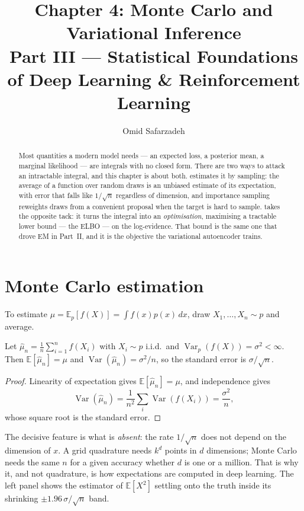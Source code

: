 \documentclass[11pt]{article}
\title{Chapter 4: Monte Carlo and Variational Inference \\ \large Part III --- Statistical Foundations of Deep Learning \& Reinforcement Learning}
\author{Omid Safarzadeh}
\date{}
\begin{document}
\maketitle

\begin{abstract}
\noindent
Most quantities a modern model needs --- an expected loss, a posterior mean, a
marginal likelihood --- are integrals with no closed form. There are two ways to
attack an intractable integral, and this chapter is about both.  estimates it by sampling: the average of a function over random draws is
an unbiased estimate of its expectation, with error that falls like
$1/\sqrt n$ regardless of dimension, and importance sampling reweights draws
from a convenient proposal when the target is hard to sample.  takes the opposite tack: it turns the integral into an
\emph{optimisation}, maximising a tractable lower bound --- the ELBO --- on the
log-evidence. That bound is the same one that drove EM in Part~II, and it is the
objective the variational autoencoder trains.
\end{abstract}

\tableofcontents

\section{Monte Carlo estimation}

To estimate $\mu = \mathbb{E}_{p}[f(X)] = \int f(x)p(x)\,dx$, draw
$X_1,\dots,X_n\sim p$ and average.

\begin{theorem}
Let $\hat\mu_n = \tfrac1n\sum_{i=1}^n f(X_i)$ with $X_i\sim p$ i.i.d.\ and
$\operatorname{Var}_p(f(X))=\sigma^2<\infty$. Then $\mathbb{E}[\hat\mu_n]=\mu$ and
$\operatorname{Var}(\hat\mu_n)=\sigma^2/n$, so the standard error is
$\sigma/\sqrt n$.
\end{theorem}
\begin{proof}
Linearity of expectation gives $\mathbb{E}[\hat\mu_n]=\mu$, and independence
gives
\[
  \operatorname{Var}(\hat\mu_n)=\frac1{n^2}\sum_i\operatorname{Var}(f(X_i))=\frac{\sigma^2}{n},
\]
whose square root is the standard error.
\end{proof}

The decisive feature is what is \emph{absent}: the rate $1/\sqrt n$ does not
depend on the dimension of $x$. A grid quadrature needs $k^d$ points in $d$
dimensions; Monte Carlo needs the same $n$ for a given accuracy whether $d$ is
one or a million. That is why it, and not quadrature, is how expectations are
computed in deep learning. The left panel shows the estimator of $\mathbb{E}[X^2]$
settling onto the truth inside its shrinking $\pm 1.96\,\sigma/\sqrt n$ band.
\end{document}
